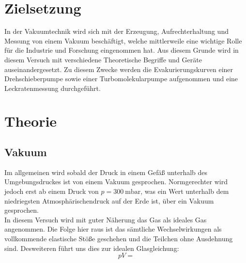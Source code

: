 \section{Zielsetzung}
In der Vakuumtechnik wird sich mit der Erzeugung, Aufrechterhaltung und Messung von einem Vakuum beschäftigt,
welche mittlerweile eine wichtige Rolle für die Industrie und Forschung eingenommen hat. Aus diesem Grunde wird
in diesem Versuch mit verschiedene Theoretische Begriffe und Geräte auseinandergesetzt. Zu diesem Zwecke werden
die Evakurierungskurven einer Drehschieberpumpe sowie einer Turbomolekularpumpe aufgenommen und eine Leckratenmessung 
durchgeführt.

\section{Theorie}
\label{sec:Theorie}

\subsection{Vakuum}
\label{sec:vakuumtheo}

Im allgemeinen wird sobald der Druck in einem Gefäß unterhalb des Umgebungsdruckes ist von einem Vakuum gesprochen. Normgerechter 
wird jedoch erst ab einem Druck von $p=\SI{300}{\milli\bar}$, was ein Wert unterhalb dem niedriegsten Atmosphärischendruck auf der 
Erde ist, über ein Vakuum gesprochen.\\
In diesem Versuch wird mit guter Näherung das Gas als ideales Gas angenommen. Die Folge hier raus ist das sämtliche Wechselwirkungen 
als vollkommende elastische Stöße geschehen und die Teilchen ohne Ausdehnung sind. Desweiteren führt uns dies zur idealen Glasgleichung:
\begin {equation}
pV=
\label{eqn:idealgas}
\end{equation}